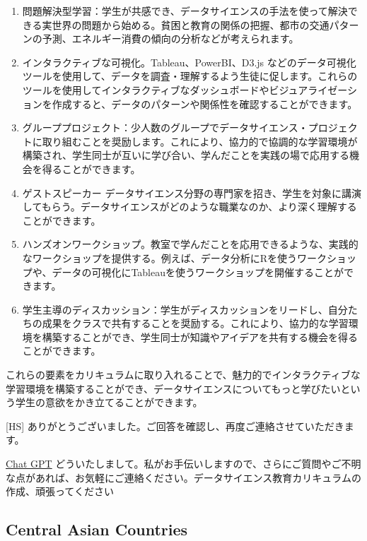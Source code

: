 \documentclass[
]{bxjsbook}
\theoremstyle{definition}
\theoremstyle{definition}
\theoremstyle{definition}
\theoremstyle{definition}
\theoremstyle{remark}
\begin{document}
\begin{enumerate}
\def\labelenumi{\arabic{enumi}.}
\item
  問題解決型学習：学生が共感でき、データサイエンスの手法を使って解決できる実世界の問題から始める。貧困と教育の関係の把握、都市の交通パターンの予測、エネルギー消費の傾向の分析などが考えられます。
\item
  インタラクティブな可視化。Tableau、PowerBI、D3.js などのデータ可視化ツールを使用して、データを調査・理解するよう生徒に促します。これらのツールを使用してインタラクティブなダッシュボードやビジュアライゼーションを作成すると、データのパターンや関係性を確認することができます。
\item
  グループプロジェクト：少人数のグループでデータサイエンス・プロジェクトに取り組むことを奨励します。これにより、協力的で協調的な学習環境が構築され、学生同士が互いに学び合い、学んだことを実践の場で応用する機会を得ることができます。
\item
  ゲストスピーカー データサイエンス分野の専門家を招き、学生を対象に講演してもらう。データサイエンスがどのような職業なのか、より深く理解することができます。
\item
  ハンズオンワークショップ。教室で学んだことを応用できるような、実践的なワークショップを提供する。例えば、データ分析にRを使うワークショップや、データの可視化にTableauを使うワークショップを開催することができます。
\item
  学生主導のディスカッション：学生がディスカッションをリードし、自分たちの成果をクラスで共有することを奨励する。これにより、協力的な学習環境を構築することができ、学生同士が知識やアイデアを共有する機会を得ることができます。
\end{enumerate}

これらの要素をカリキュラムに取り入れることで、魅力的でインタラクティブな学習環境を構築することができ、データサイエンスについてもっと学びたいという学生の意欲をかき立てることができます。

{[}HS{]} ありがとうございました。ご回答を確認し、再度ご連絡させていただきます。

\protect\hyperlink{chatgpt}{Chat GPT} どういたしまして。私がお手伝いしますので、さらにご質問やご不明な点があれば、お気軽にご連絡ください。データサイエンス教育カリキュラムの作成、頑張ってください

\hypertarget{centralasia}{%
\subsection{Central Asian Countries}\label{centralasia}}
\end{document}
